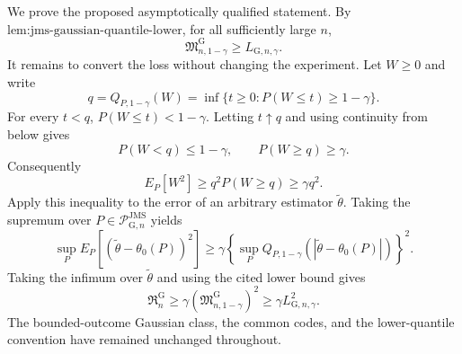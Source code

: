 We prove the proposed asymptotically qualified statement.  By \(\text{lem:jms-gaussian-quantile-lower}\), for all sufficiently large \(n\),
\[
 \mathfrak M_{n,1-\gamma}^{\mathrm G}\ge L_{\mathrm G,n,\gamma}.
\]
It remains to convert the loss without changing the experiment.  Let \(W\ge0\) and write
\[
 q=Q_{P,1-\gamma}(W)=\inf\{t\ge0:P(W\le t)\ge1-\gamma\}.
\]
For every \(t<q\), \(P(W\le t)<1-\gamma\).  Letting \(t\uparrow q\) and using continuity from below gives
\[
 P(W<q)\le1-\gamma,
 \qquad
 P(W\ge q)\ge\gamma.
\]
Consequently
\[
 E_P[W^2]\ge q^2P(W\ge q)\ge\gamma q^2.
\]
Apply this inequality to the error of an arbitrary estimator \(\widetilde\theta\).  Taking the supremum over \(P\in\mathcal P_{\mathrm G,n}^{\mathrm{JMS}}\) yields
\[
 \sup_P E_P[(\widetilde\theta-\theta_0(P))^2]
 \ge\gamma\left\{\sup_PQ_{P,1-\gamma}(|\widetilde\theta-\theta_0(P)|)\right\}^2.
\]
Taking the infimum over \(\widetilde\theta\) and using the cited lower bound gives
\[
 \mathfrak R_n^{\mathrm G}
 \ge\gamma(\mathfrak M_{n,1-\gamma}^{\mathrm G})^2
 \ge\gamma L_{\mathrm G,n,\gamma}^2.
\]
The bounded-outcome Gaussian class, the common codes, and the lower-quantile convention have remained unchanged throughout.